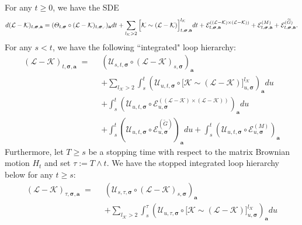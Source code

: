 \begin{lemma} 
    \label{Sol_CalL}
For any $t\geq0$, we have the SDE
%
\begin{align}\label{LK_SDE}
d({\cal L}-{\cal K})_{t,\boldsymbol{\sigma},\textbf{a}}=(\varTheta_{t,\boldsymbol{\sigma}}\circ({\cal L}-{\cal K})_{t,\boldsymbol{\sigma},\cdot})_{\textbf{a}}dt+\sum_{l_\mathcal{K} > 2} \Big[\mathcal{K} \sim (\mathcal{L} - \mathcal{K})\Big]^{l_\mathcal{K}}_{t, \boldsymbol{\sigma}, \textbf{a}}dt + \mathcal{E}^{((\mathcal{L} - \mathcal{K}) \times (\mathcal{L} - \mathcal{K}))}_{t, \boldsymbol{\sigma}, \textbf{a}} +
    \mathcal{E}^{(M)}_{t, \boldsymbol{\sigma}, \textbf{a}} +
    \mathcal{E}^{(\widetilde{G})}_{t, \boldsymbol{\sigma}, \textbf{a}}.
\end{align}
%    
For any $s<t$, we have the following ``integrated" loop hierarchy:
\begin{align}\label{int_K-LcalE}
    (\mathcal{L} - \mathcal{K})_{t, \boldsymbol{\sigma}, \textbf{a}} \;=\; \; &
    \left(\mathcal{U}_{s, t, \boldsymbol{\sigma}} \circ (\mathcal{L} - \mathcal{K})_{s, \boldsymbol{\sigma}}\right)_{\textbf{a}} \nonumber \\
    &+ \sum_{l_\mathcal{K} > 2} \int_{s}^t \left(\mathcal{U}_{u, t, \boldsymbol{\sigma}} \circ \Big[\mathcal{K} \sim (\mathcal{L} - \mathcal{K})\Big]^{l_\mathcal{K}}_{u, \boldsymbol{\sigma}}\right)_{\textbf{a}} du \nonumber \\
    &+ \int_{s}^t \left(\mathcal{U}_{u, t, \boldsymbol{\sigma}} \circ \mathcal{E}^{((\mathcal{L} - \mathcal{K}) \times (\mathcal{L} - \mathcal{K}))}_{u, \boldsymbol{\sigma}}\right)_{\textbf{a}} du  \nonumber \\
    &+ \int_{s}^t \left(\mathcal{U}_{u, t, \boldsymbol{\sigma}} \circ \mathcal{E}^{(\widetilde{G})}_{u, \boldsymbol{\sigma}}\right)_{\textbf{a}} du + \int_{s}^t \left(\mathcal{U}_{u, t, \boldsymbol{\sigma}} \circ \mathcal{E}^{(M)}_{u, \boldsymbol{\sigma}}\right)_{\textbf{a}}  
\end{align}
Furthermore, let $T\geq s$ be a stopping time with respect to the matrix Brownian motion $H_t$ and set $\tau:= T\wedge t$. We have the stopped integrated loop hierarchy below for any $t\geq s$:
\begin{align}\label{int_K-L_ST}
   (\mathcal{L} - \mathcal{K})_{\tau , \boldsymbol{\sigma}, \textbf{a}} \;=\; \; &
    \left(\mathcal{U}_{s, \tau, \boldsymbol{\sigma}} \circ (\mathcal{L} - \mathcal{K})_{s, \boldsymbol{\sigma}}\right)_{\textbf{a}}  \nonumber \\
    &+ \sum_{l_\mathcal{K} > 2} \int_{s}^\tau \left(\mathcal{U}_{u, \tau, \boldsymbol{\sigma}} \circ \Big[\mathcal{K} \sim (\mathcal{L} - \mathcal{K})\Big]^{l_\mathcal{K}}_{u, \boldsymbol{\sigma}}\right)_{\textbf{a}} du  \nonumber \\

\end{align}
\end{lemma}
